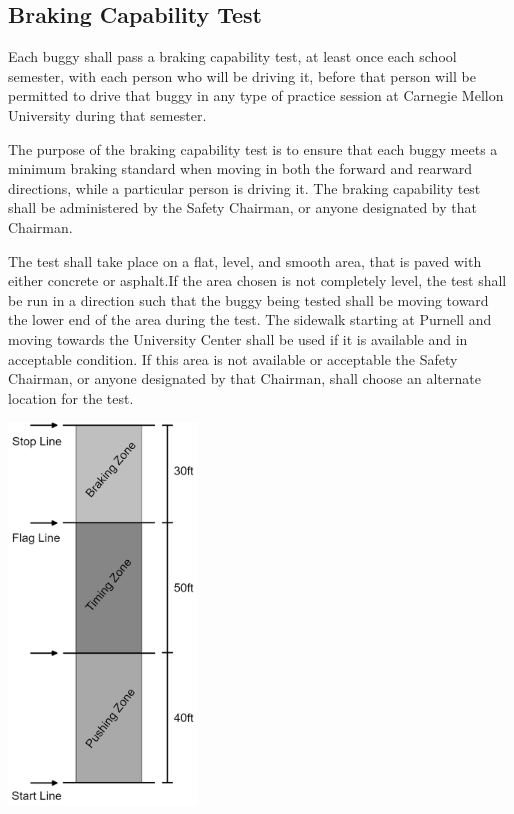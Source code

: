 \subsection{Braking Capability Test}

	Each buggy shall pass a braking capability test, at least once each school semester, with each person who will be driving it, before that person will be permitted to drive that buggy in any type of practice session at
	Carnegie Mellon University during that semester. 
	
	The purpose of the braking capability test is to ensure that each buggy meets a minimum braking standard when moving in both the forward and rearward directions, while a particular person is driving it. The braking capability test shall be administered by the Safety Chairman, or anyone designated by that Chairman.

	The test shall take place on a flat, level, and smooth area, that is paved with either concrete or asphalt.If the area chosen is not completely level, the test shall be run in a direction such that the buggy being tested shall be moving toward the lower end of the area during the test. The sidewalk starting at Purnell and moving towards the University Center shall be used if it is available and in acceptable condition. If this area is not available or acceptable the Safety Chairman, or anyone designated by that Chairman, shall choose an alternate location for the test. 

	\begin{center}
		\includegraphics[height=4in]{assets/Buggy-Brake-Test-gs.png}
	\end{center}
	
